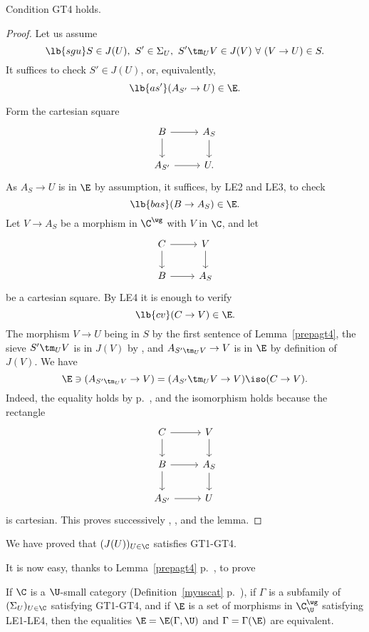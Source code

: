 \documentclass[12pt]{article}
\theoremstyle{remark}
\theoremstyle{definition}
\begin{document}
\begin{lem}
Condition GT4 holds.
\end{lem}

\begin{proof} 
Let us assume 
\begin{equation}\lb{sgu}
S\in J(U),\ S'\in\Sigma_U,\ S'\tm_UV\in J(V)\ \forall\ (V\to U)\in S.
\end{equation}
It suffices to check $S'\in J(U)$, or, equivalently, 
\begin{equation}\lb{as'}
(A_{S'}\to U)\in\E.
\end{equation}

Form the cartesian square 
$$
\begin{tikzcd}
B\ar{r}\ar{d}&A_S\ar{d}\\ 
A_{S'}\ar{r}&U.
\end{tikzcd}
$$ 
As $A_S\to U$ is in $\E$ by assumption, it suffices, by LE2 and LE3, to check 
\begin{equation}\lb{bas}
(B\to A_S)\in\E.
\end{equation} 
Let $V\to A_S$ be a morphism in $\C^\wg$ with $V$ in $\C$, and let 
$$
\begin{tikzcd}
C\ar{r}\ar{d}&V\ar{d}\\ 
B\ar{r}&A_S
\end{tikzcd}
$$ 
be a cartesian square. By LE4 it is enough to verify 
\begin{equation}\lb{cv}
(C\to V)\in\E.
\end{equation} 
The morphism $V\to U$ being in $S$ by the first sentence of Lemma~\ref{prepagt4}, the sieve $S'\tm_UV$ is in $J(V)$ by , and $A_{S'\tm_UV}\to V$ is in $\E$ by definition of $J(V)$. We have 
$$
\E\ni(A_{S'\tm_UV}\to V)=(A_{S'}\tm_UV\to V)\iso(C\to V).
$$ 
Indeed, the equality holds by  p.~, and the isomorphism holds because the rectangle 
$$
\begin{tikzcd}
C\ar{r}\ar{d}&V\ar{d}\\ 
B\ar{r}\ar{d}&A_S\ar{d}\\ 
A_{S'}\ar{r}&U
\end{tikzcd}
$$ 
is cartesian. This proves successively , ,  and the lemma.  
\end{proof}

We have proved that $(J(U))_{U\in\C}$ satisfies GT1-GT4. 

It is now easy, thanks to Lemma~\ref{prepagt4} p.~, to prove 

\begin{thm}
If $\C$ is a $\U$-small category (Definition~\ref{myuscat} p.~), if $\Gamma$ is a subfamily of $(\Sigma_U)_{U\in\C}$ satisfying GT1-GT4, and if $\E$ is a set of morphisms in $\C^\wg_\U$ satisfying LE1-LE4, then the equalities $\E=\E(\Gamma,\U)$ and $\Gamma=\Gamma(\E)$ are equivalent.
\end{thm}
\end{document}
